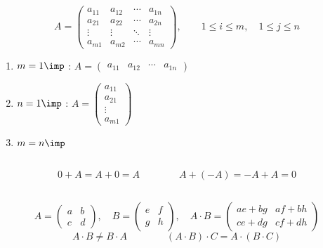 
\[
A=\begin{pmatrix}
a_{11} & a_{12} & \cdots & a_{1n}\\
a_{21} & a_{22} & \cdots & a_{2n}\\
\vdots & \vdots & \ddots & \vdots\\
a_{m1} & a_{m2} & \cdots & a_{mn}
\end{pmatrix},\qquad 1\le i\le m,\quad 1\le j\le n
\]

\begin{enumerate}[label=\arabic*),leftmargin=*]
\item $m=1 \imp$ :
  $A=\begin{pmatrix}a_{11}&a_{12}&\cdots&a_{1n}\end{pmatrix}$
\item $n=1 \imp$ :
  $A=\begin{pmatrix}a_{11}\\a_{21}\\\vdots\\a_{m1}\end{pmatrix}$
\item $m=n \imp$ 
\end{enumerate}

\subsection{}
\[
0+A=A+0=A \qquad\qquad A+(-A)=-A+A=0
\]

\subsection{}
\[
A=\begin{pmatrix}a&b\\c&d\end{pmatrix},\quad
B=\begin{pmatrix}e&f\\g&h\end{pmatrix},\quad
A\cdot B=\begin{pmatrix}ae+bg & af+bh\\ ce+dg & cf+dh\end{pmatrix}
\]
\[
A\cdot B\neq B\cdot A \qquad\qquad (A\cdot B)\cdot C=A\cdot(B\cdot C)
\]

